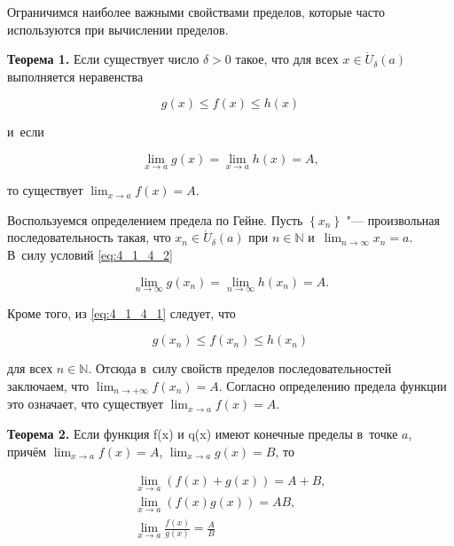 
Ограничимся наиболее важными свойствами пределов, которые часто используются
при вычислении пределов.

\textbf{Теорема 1.}\label{th:4_1_4_1} Если существует число $\delta > 0$ такое,
что для всех $x \in \dot U_{\delta}(a)$ выполняется неравенства

\begin{equation}\label{eq:4_1_4_1}
g(x) \leqslant f(x) \leqslant h(x)
\end{equation}

\noindent
и~если

\begin{equation}\label{eq:4_1_4_2}
\displaystyle \lim_{x \to a} g(x) = \lim_{x \to a} h(x) = A,
\end{equation}

\noindent
то существует $\displaystyle \lim_{x \to a} f(x) = A$.

Воспользуемся определением предела по Гейне.
Пусть $\left\{ x_{n} \right\}$ "--- произвольная последовательность такая,
что $x_{n} \in \dot U_{\delta}(a)$ при $n \in \mathbb{N}$
и~$\displaystyle \lim_{n \to \infty} x_{n} = a$.
В~силу условий \eqref{eq:4_1_4_2}

\begin{equation*}
\displaystyle \lim_{n \to \infty} g(x_{n}) = \lim_{n \to \infty} h(x_{n}) = A.
\end{equation*}

Кроме того, из \eqref{eq:4_1_4_1} следует, что

\begin{equation*}
g(x_{n}) \leqslant f(x_{n}) \leqslant h(x_{n})
\end{equation*}

\noindent
для всех $n \in \mathbb{N}$. Отсюда в~силу свойств пределов последовательностей
заключаем, что $\displaystyle \lim_{n \to +\infty} f(x_{n}) = A$.
Согласно определению предела функции это означает, что существует
$\displaystyle \lim_{x \to a} f(x) = A$.

\textbf{Теорема 2.}\label{th:4_1_4_2} Если функция f(x) и q(x) имеют конечные пределы
в~точке $a$, причём $\displaystyle \lim_{x \to a} f(x) = A$,
$\displaystyle \lim_{x \to a} g(x) = B$, то

\begin{gather}
\displaystyle \lim_{x \to a} \left( f(x) + g(x) \right) = A + B, \label{eq:4_1_4_3} \\
\displaystyle \lim_{x \to a} \left( f(x) g(x) \right) = AB, \label{eq:4_1_4_4} \\
\displaystyle \lim_{x \to a} \frac{f(x)}{g(x)} = \frac{A}{B} \label{eq:4_1_4_5}
\end{gather}

